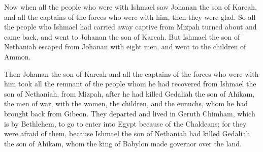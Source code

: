 {Now when all the people who were with Ishmael saw Johanan the son of Kareah, and all the captains of the forces who were with him, then they were glad.
So all the people who Ishmael had carried away captive from Mizpah turned about and came back, and went to Johanan the son of Kareah.
But Ishmael the son of Nethaniah escaped from Johanan with eight men, and went to the children of Ammon.
\par }{\PP {}Then Johanan the son of Kareah and all the captains of the forces who were with him took all the remnant of the people whom he had recovered from Ishmael the son of Nethaniah, from Mizpah, after he had killed Gedaliah the son of Ahikam, the men of war, with the women, the children, and the eunuchs, whom he had brought back from Gibeon.
They departed and lived in Geruth Chimham, which is by Bethlehem, to go to enter into Egypt
because of the Chaldeans; for they were afraid of them, because Ishmael the son of Nethaniah had killed Gedaliah the son of Ahikam, whom the king of Babylon made governor over the land.

}
